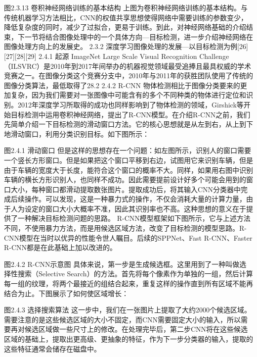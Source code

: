 图2.3.13 卷积神经网络训练的基本结构
上图为卷积神经网络训练的基本结构。与传统机器学习方法相比，CNN的权值共享思想使得网络中需要训练的参数变少，降低复杂度的同时，减少了过拟合，更易于训练。到此，对神经网络基础的介绍结束，下一节将结合图像处理中的一个具体方向---目标检测，进一步介绍神经网络在图像处理方向上的发展史。
2.3.2 深度学习图像处理的发展---以目标检测为例[26][27][28][29]
2.4.1 起源
ImageNet Large Scale Visual Recognition Challenge（ILSVRC）是2010年到2017年间举办的机器视觉领域最受追捧且最具权威的学术竞赛之一。在图像分类这个竞赛分支中，2010年与2011年的获胜团队使用了传统的图像分类算法，最低取得了28.2%
2.4.2 R-CNN
物体检测相比于图像分类要来的更加复杂，因为我们需要对一张图像中可能含有的多个不同种类的物体进行定位和识别。2012年深度学习所取得的成功也同样影响到了物体检测的领域，Girshick等开始目标检测中运用卷积神经网络，提出了R-CNN模型。在介绍R-CNN之前，我们先简单介绍一下目标检测的滑动窗口方法。它的核心思想就是从左到右，从上到下地滑动窗口，利用分类识别目标。如下图所示：

图2.4.1 滑动窗口
但是这样的思想存在一个问题：如左图所示，识别人的窗口需要一个竖长方形窗口。但是如果把这个窗口平移到右边，试图用它来识别车辆，但是由于车辆的宽度大于长度，能符合这个窗口的概率不大。同样，如果用右图中识别车辆的横长方形识别人，也同样不成功。因此需要提前设计好多个可能会用到的窗口大小，每种窗口都滑动提取数张图片。提取成功后，将其输入CNN分类器中完成后续操作。可以发现，这是一种暴力式的操作，不仅会消耗大量的计算力量，由于人为设定的窗口大小大概率不准，因此其识别率也不高。这种思想的意义在于提供了一种解决目标检测问题的思路。
R-CNN模型框架如下图所示，它与上述方法不同，不使用暴力方法，而是用候选区域方法，改变了目标检测的模型思路。R-CNN模型在当时以优异的性能令世人瞩目。后续的SPPNet、Fast R-CNN、Faster R-CNN都是在此基础上加以改进的。

图2.4.2 R-CNN示意图
具体来说，第一步是生成候选框。这里用到了一种叫做选择性搜索（Selective Search）的方法。首先将每个像素作为单独的一组，然后计算每一组的纹理，将两个最接近的组结合起来，重复这样的操作直到所有区域不能再结合为止。下图展示了如何使区域增长：

图2.4.3 选择搜索算法
这一步中，我们在一张图片上提取了大约2000个候选区域。需要注意的是这些候选区域的大小不固定，而CNN需要固定大小的输入，所以需要再对候选区域做一些尺寸上的修改。在处理完毕后，第二步CNN将在这些候选区域的基础上，提取出更高级、更抽象的特征，作为下一步分类器的输入，提取的这些特征通常会储存在磁盘中。

